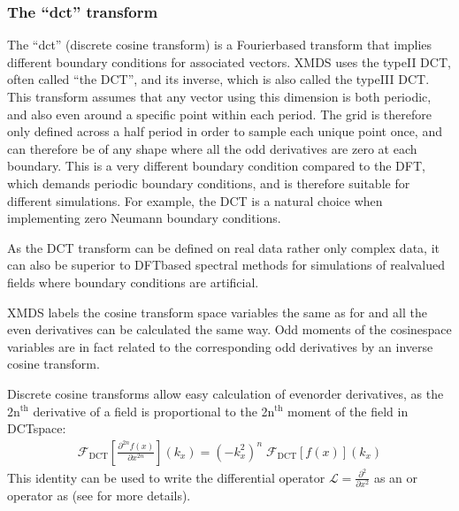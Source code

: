 \documentclass[letterpaper,10pt,english]{sphinxmanual}
\begin{document}
\subsubsection{The “dct” transform}
\label{\detokenize{reference_elements:the-dct-transform}}\label{\detokenize{reference_elements:dct-transform}}\label{\detokenize{reference_elements:index-35}}
\ignorespaces 
\sphinxAtStartPar
The “dct” (discrete cosine transform) is a Fourier\sphinxhyphen{}based transform that implies different boundary conditions for associated vectors.  XMDS uses the type\sphinxhyphen{}II DCT, often called “the DCT”, and its inverse, which is also called the type\sphinxhyphen{}III DCT.  This transform assumes that any vector using this dimension is both periodic, and also even around a specific point within each period.  The grid is therefore only defined across a half period in order to sample each unique point once, and can therefore be of any shape where all the odd derivatives are zero at each boundary.  This is a very different boundary condition compared to the DFT, which demands periodic boundary conditions, and is therefore suitable for different simulations.  For example, the DCT is a natural choice when implementing zero Neumann boundary conditions.

\sphinxAtStartPar
As the DCT transform can be defined on real data rather only complex data, it can also be superior to DFT\sphinxhyphen{}based spectral methods for simulations of real\sphinxhyphen{}valued fields where boundary conditions are artificial.

\sphinxAtStartPar
XMDS labels the cosine transform space variables the same as for {\hyperref[\detokenize{reference_elements:dft-transform}]{}} and all the even derivatives can be calculated the same way.  Odd moments of the cosine\sphinxhyphen{}space variables are in fact  related to the corresponding odd derivatives by an inverse cosine transform.

\sphinxAtStartPar
Discrete cosine transforms allow easy calculation of even\sphinxhyphen{}order derivatives, as the 2n$^{\text{th}}$ derivative of a field is proportional to the 2n$^{\text{th}}$ moment of the field in DCT\sphinxhyphen{}space:
\begin{equation*}
\begin{split}\mathcal{F}_\text{DCT}\left[\frac{\partial^{2n} f(x)}{\partial x^{2n}}\right](k_x) = (-k_x^2)^{n}\; \mathcal{F}_\text{DCT}\left[f(x)\right](k_x)\end{split}
\end{equation*}
\sphinxAtStartPar
This identity can be used to write the differential operator \(\mathcal{L} = \frac{\partial^2}{\partial x^2}\) as an  or  operator as  (see {\hyperref[\detokenize{reference_elements:operatorselement}]{}} for more details).
\end{document}
